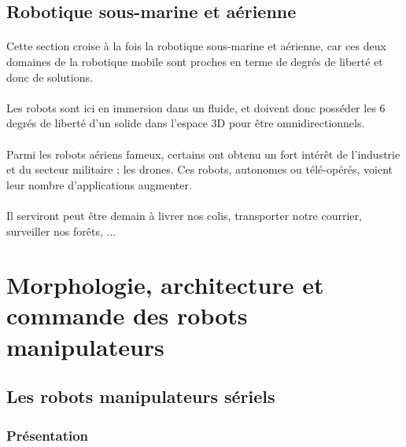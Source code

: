 \documentclass[a4paper,10pt]{article}
\begin{document}
        \subsection{Robotique sous-marine et aérienne} 
            \paragraph{} 
                Cette section croise à la fois la robotique sous-marine et aérienne, 
                car ces deux domaines de la robotique mobile sont proches en terme
                de degrés de liberté et donc de solutions. 
                
            \paragraph{}
                Les robots sont ici en immersion dans un fluide, et doivent donc 
                posséder les 6 degrés de liberté d'un solide dans l'espace 3D pour
                être omnidirectionnels. 
                
            \paragraph{}
                Parmi les robots aériens fameux, certains ont obtenu un fort intérêt 
                de l'industrie et du secteur militaire : les drones. Ces robots, 
                autonomes ou télé-opérés, voient leur nombre d'applications 
                augmenter. 
                
            \paragraph{}
                Il serviront peut être demain à livrer nos colis, transporter 
                notre courrier, surveiller nos forêts, ... 
                
                        
    \section{Morphologie, architecture et commande des robots manipulateurs}
        \subsection{Les robots manipulateurs sériels}
            \subsubsection{Présentation}
\end{document}
